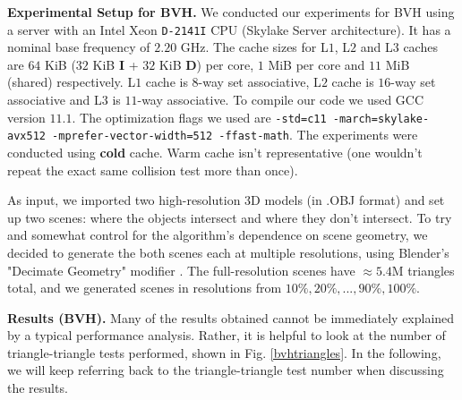 \documentclass[twocolumn]{article}
\newcommand{\mypar}[1]{{\bf #1.}}
\begin{document}

\mypar{Experimental Setup for BVH}
We conducted our experiments for BVH using a server with an Intel Xeon \texttt{D-2141I} CPU (Skylake Server architecture).
It has a nominal base frequency of $2.20$ GHz. %
The cache sizes for L$1$, L$2$ and L$3$ caches are $64$ KiB ($32$ KiB \textbf{I} + $32$ KiB \textbf{D}) per core, $1$ MiB per core and $11$ MiB (shared) respectively.
L$1$ cache is $8$-way set associative, L$2$ cache is $16$-way set associative and L$3$ is $11$-way associative.
To compile our code we used GCC version $11.1$.
The optimization flags we used are \texttt{-std=c11 -march=skylake-avx512 -mprefer-vector-width=512 -ffast-math}.
The experiments were conducted using \textbf{cold} cache.
Warm cache isn't representative (one wouldn't repeat the exact same collision test more than once).

As input, we imported two high-resolution $3$D models (in .OBJ format) and set up two scenes: where the objects intersect and where they don't intersect.
To try and somewhat control for the algorithm's dependence on scene geometry, we decided to generate the both scenes each at multiple resolutions, using Blender's "Decimate Geometry" modifier \cite{blender}.
The full-resolution scenes have $\approx 5.4$M triangles total, and we generated scenes in resolutions from $10\%, 20\%, ..., 90\%, 100\%$.

\mypar{Results (BVH)} Many of the results obtained cannot be immediately explained by a typical performance analysis.
Rather, it is helpful to look at the number of triangle-triangle tests performed, shown in Fig. \ref{bvhtriangles}.
In the following, we will keep referring back to the triangle-triangle test number when discussing the results.
\end{document}
